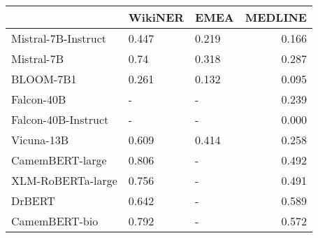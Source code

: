 \begin{tabular}{lllr}
\toprule
{} & WikiNER &   EMEA &  MEDLINE \\
\midrule
Mistral-7B-Instruct &   0.447 &  0.219 &    0.166 \\
Mistral-7B          &    0.74 &  0.318 &    0.287 \\
BLOOM-7B1           &   0.261 &  0.132 &    0.095 \\
Falcon-40B          &       - &      - &    0.239 \\
Falcon-40B-Instruct &       - &      - &    0.000 \\
Vicuna-13B          &   0.609 &  0.414 &    0.258 \\
CamemBERT-large     &   0.806 &      - &    0.492 \\
XLM-RoBERTa-large   &   0.756 &      - &    0.491 \\
DrBERT              &   0.642 &      - &    0.589 \\
CamemBERT-bio       &   0.792 &      - &    0.572 \\
\bottomrule
\end{tabular}
